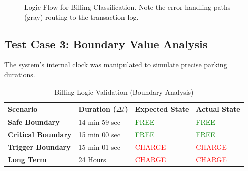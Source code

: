 \begin{figure}[H]
	\caption{Logic Flow for Billing Classification. Note the error handling paths (gray) routing to the transaction log.}
	\label{fig:billing_logic}
\end{figure}

\subsection{Test Case 3: Boundary Value Analysis}
The system's internal clock was manipulated to simulate precise parking durations.

\begin{table}[H]
	\centering
	\caption{Billing Logic Validation (Boundary Analysis)}
	\label{tab:billing_boundary}
	\begin{tabular}{|l|l|l|l|}
		\hline
		\textbf{Scenario} & \textbf{Duration ($\Delta t$)} & \textbf{Expected State} & \textbf{Actual State} \\ \hline
		\textbf{Safe Boundary} & 14 min 59 sec & \textcolor{green}{FREE} & \textcolor{green}{FREE} \\ \hline
		\textbf{Critical Boundary} & 15 min 00 sec & \textcolor{green}{FREE} & \textcolor{green}{FREE} \\ \hline
		\textbf{Trigger Boundary} & 15 min 01 sec & \textcolor{red}{CHARGE} & \textcolor{red}{CHARGE} \\ \hline
		\textbf{Long Term} & 24 Hours & \textcolor{red}{CHARGE} & \textcolor{red}{CHARGE} \\ \hline
	\end{tabular}
\end{table}

